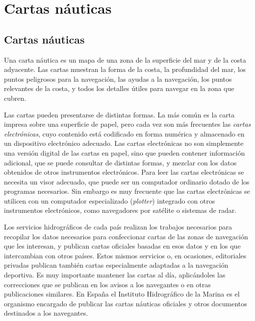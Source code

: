 \chapter{Cartas náuticas}
\label{ch:cartas}
\section{Cartas náuticas }



Una carta náutica es un mapa de una zona de la superficie del mar y de la costa adyacente.
Las cartas muestran la forma de la costa, la profundidad del mar, los puntos peligrosos para 
la navegación, las ayudas a la navegación, los puntos relevantes de la costa, y todos los 
detalles útiles para navegar en la zona que cubren. 

Las cartas pueden presentarse de distintas formas. La más común es la carta impresa 
sobre una superficie de papel, pero cada vez son más frecuentes las \emph{cartas electrónicas}, 
cuyo contenido está codificado en forma numérica y almacenado en un dispositivo electrónico adecuado. Las cartas electrónicas no son simplemente una versión digital de las cartas 
en papel, sino que pueden contener información adicional, que se puede consultar de distintas formas, y mezclar con los datos obtenidos de otros instrumentos electrónicos. Para 
leer las cartas electrónicas se necesita un visor adecuado, que puede ser un computador 
ordinario dotado de los programas necesarios. Sin embargo es muy frecuente que las cartas electrónicas 
se utilicen con un computador especializado (\emph{plotter}) integrado con otros instrumentos electrónicos, como 
navegadores por satélite o sistemas de radar. 

Los servicios hidrográficos de cada país realizan los trabajos necesarios para recopilar 
los datos necesarios para confeccionar cartas de las zonas de navegación que les interesan, 
y publican cartas oficiales basadas en esos datos y en los que intercambian con otros países. Estos mismos servicios o, en ocasiones, editoriales privadas publican también cartas 
especialmente adaptadas a la navegación deportiva. Es muy importante mantener las cartas 
al día, aplicándoles las correcciones que se publican en los avisos a los navegantes o en 
otras publicaciones similares. En España el Instituto Hidrográfico de la Marina es el organismo encargado de publicar las cartas náuticas oficiales y otros documentos destinados a los navegantes.

